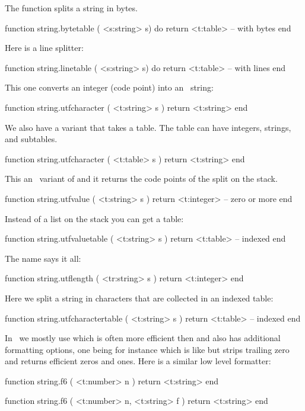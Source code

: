 The  function splits a string in bytes.

\starttyping[option=LUA]
function string.bytetable ( <s:string> s) do
    return <t:table> -- with bytes
end
\stoptyping

Here is a line splitter:

\starttyping[option=LUA]
function string.linetable  ( <s:string> s) do
    return <t:table> -- with lines
end
\stoptyping

This one converts an integer (code point) into an \UTF\ string:

\starttyping[option=LUA]
function string.utfcharacter ( <t:string> s )
    return <t:string>
end
\stoptyping

We also have a variant that takes a table. The table can have integers, strings,
and subtables.

\starttyping[option=LUA]
function string.utfcharacter ( <t:table> s )
    return <t:string>
end
\stoptyping

This an \ variant of  and it returns the code points of
the split on the stack.

\starttyping[option=LUA]
function string.utfvalue ( <t:string> s )
    return <t:integer> -- zero or more
end
\stoptyping

Instead of a list on the stack you can get a table:

\starttyping[option=LUA]
function string.utfvaluetable ( <t:string> s )
    return <t:table> -- indexed
end
\stoptyping

The name says it all:

\starttyping[option=LUA]
function string.utflength ( <tr:string> s )
    return <t:integer>
end
\stoptyping

Here we split a string in characters that are collected in an indexed table:

\starttyping[option=LUA]
function string.utfcharactertable ( <t:string> s )
    return <t:table> -- indexed
end
\stoptyping

In \CONTEXT\ we mostly use  which is often more
efficient then  and also has additional formatting options,
one being for instance  which is like  but strips trailing zero
and returns efficient zeros and ones. Here is a similar low level formatter:

\starttyping[option=LUA]
function string.f6 ( <t:number> n )
    return <t:string>
end

function string.f6 ( <t:number> n,  <t:string> f )
    return <t:string>
end
\stoptyping


